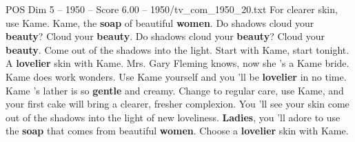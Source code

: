 \begin{textsample}{POS Dim 5 – 1950 – Score 6.00 – 1950/tv\_com\_1950\_20.txt}  \label{ex:f5_pos_042}
For clearer skin, use Kame.
Kame, the \textbf{soap} of beautiful \textbf{women}.
Do shadows cloud your \textbf{beauty}?
Cloud your \textbf{beauty}.
Do shadows cloud your \textbf{beauty}?
Cloud your \textbf{beauty}.
Come out of the shadows into the light.
Start with Kame, start tonight.
A \textbf{lovelier} skin with Kame.
Mrs.
Gary Fleming knows, now she 's a Kame bride.
Kame does work wonders.
Use Kame yourself and you 'll be \textbf{lovelier} in no time.
Kame 's lather is so \textbf{gentle} and creamy.
Change to regular care, use Kame, and your first cake will bring a clearer, fresher complexion.
You 'll see your skin come out of the shadows into the light of new loveliness. \textbf{Ladies}, you 'll adore to use the \textbf{soap} that comes from beautiful \textbf{women}.
Choose a \textbf{lovelier} skin with Kame.

\end{textsample}
